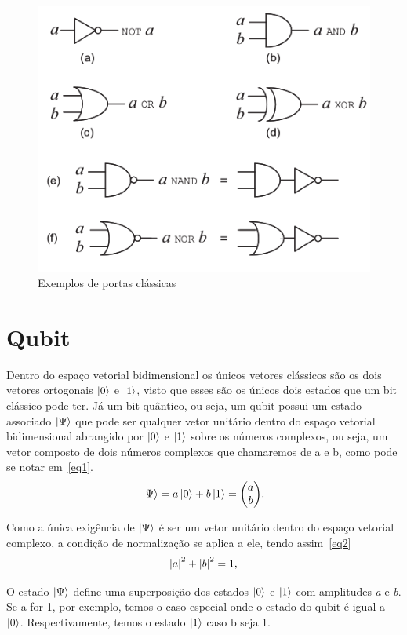 \documentclass[a4paper, 12pt, oneside]{book}
\begin{document}
\begin{figure}[H]
\centering
\includegraphics[scale=0.5]{classiccircuit.png}
\caption{Exemplos de portas clássicas}
\label{fig:classiccircuit}
\end{figure}

\section{Qubit}
Dentro do espaço vetorial bidimensional os únicos vetores clássicos são os dois vetores ortogonais $\ket{0}$ e $\ket{1}$, visto que esses são os únicos dois estados que um bit clássico pode ter. Já um bit quântico, ou seja, um qubit possui um estado associado $\ket{\Psi}$ que pode ser qualquer vetor unitário dentro do espaço vetorial bidimensional abrangido por $\ket{0}$ e $\ket{1}$ sobre os números complexos, ou seja, um vetor composto de dois números complexos que chamaremos de a e b, como pode se notar em~\eqref{eq1}.
\begin{equation} \label{eq1} 
\ket{\Psi} = a\ket{0} + b\ket{1} = \mqty(a\\b).
\end{equation}

Como a única exigência de $\ket{\Psi}$ é ser um vetor unitário dentro do espaço vetorial complexo, a condição de normalização se aplica a ele, tendo assim~\eqref{eq2}
\begin{equation}\label{eq2}
\abs{a}^2 + \abs{b}^2 = 1,
\end{equation}

O estado $\ket{\Psi}$ define uma superposição dos estados $\ket{0}$ e $\ket{1}$ com amplitudes \textit{a} e \textit{b}. Se a for 1, por exemplo, temos o caso especial onde o estado do qubit é igual a $\ket{0}$. Respectivamente, temos o estado $\ket{1}$ caso b seja 1.
\end{document}
